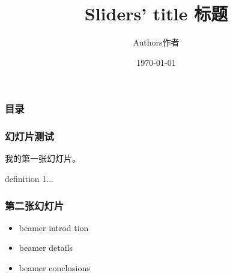 \documentclass[cjk]{beamer}
\title{Sliders' title 标题}
\author{Authors作者}
\date{\today}
\begin{document}
    
    \begin{CJK*}{GBK}{song}     %
    
        \begin{frame} %
    
            \titlepage   
    
        \end{frame}
    
    
    
        \begin{frame}
    
            \frametitle{目录}
    
            \tableofcontents
    
        \end{frame}
    
    
    
        \begin{frame}
    
            \frametitle{幻灯片测试}
    
            \pause
    
            我的第一张幻灯片。
    
            \begin{definition}
    
                definition 1...
    
            \end{definition}
    
        \end{frame}
    
            
    
        \begin{frame}
    
            \frametitle{第二张幻灯片}\pause
    
            \begin{itemize}
    
             \item beamer introd tion \pause
    
             \item beamer details \pause
    
             \item beamer conclusions
    
            \end{itemize}
    
        \end{frame}
    
        
    
    \end{CJK*}
    
    
\end{document}
